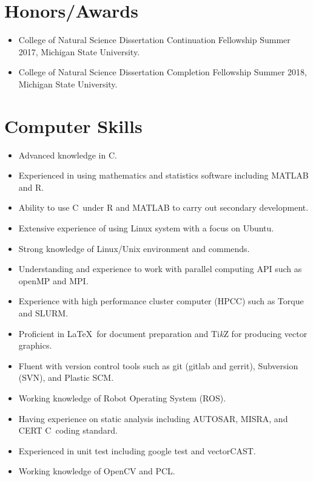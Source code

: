\documentclass[a4paper,10pt,dvipdfmx]{article}
\def\CC{{C\nolinebreak[4]\hspace{-.05em}\raisebox{.4ex}{\tiny\bf ++}}}
\begin{document}
\section*{Honors/Awards}
\begin{itemize}[noitemsep,nolistsep]
  \item College of Natural Science Dissertation Continuation Fellowship Summer 2017, Michigan State University.
  \item College of Natural Science Dissertation Completion Fellowship Summer 2018, Michigan State University.
\end{itemize}

\section*{Computer Skills}
\begin{itemize}[noitemsep,nolistsep]
  \item Advanced knowledge in \CC.
  \item Experienced in using mathematics and statistics software including \textsf{MATLAB} and \textsf{R}.
  \item Ability to use \CC~under \textsf{R} and \textsf{MATLAB} to carry out secondary development.
  \item Extensive experience of using Linux system with a focus on Ubuntu.
  \item Strong knowledge of Linux/Unix environment and commends.
  \item Understanding and experience to work with parallel computing API such as openMP and MPI.
  \item Experience with high performance cluster computer (HPCC) such as Torque and SLURM.
  \item Proficient in \LaTeX~for document preparation and Ti\textit{k}Z for producing vector graphics.
  \item Fluent with version control tools such as git (gitlab and gerrit), Subversion (SVN), and Plastic SCM.
  \item Working knowledge of Robot Operating System (ROS).
  \item Having experience on static analysis including AUTOSAR, MISRA, and CERT \CC~coding standard.
  \item Experienced in unit test including google test and vectorCAST.
  \item Working knowledge of OpenCV and PCL.
\end{itemize}
\end{document}
